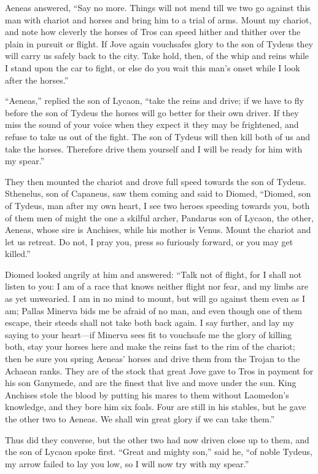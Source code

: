 Aeneas answered, “Say no more. Things will not mend till we two go against
this man with chariot and horses and bring him to a trial of arms. Mount
my chariot, and note how cleverly the horses of Tros can speed hither and
thither over the plain in pursuit or flight. If Jove again vouchsafes
glory to the son of Tydeus they will carry us safely back to the city.
Take hold, then, of the whip and reins while I stand upon the car to
fight, or else do you wait this man’s onset while I look after the
horses.”

“Aeneas,” replied the son of Lycaon, “take the reins and drive; if we have
to fly before the son of Tydeus the horses will go better for their own
driver. If they miss the sound of your voice when they expect it they may
be frightened, and refuse to take us out of the fight. The son of Tydeus
will then kill both of us and take the horses. Therefore drive them
yourself and I will be ready for him with my spear.”

They then mounted the chariot and drove full speed towards the son of
Tydeus. Sthenelus, son of Capaneus, saw them coming and said to Diomed,
“Diomed, son of Tydeus, man after my own heart, I see two heroes speeding
towards you, both of them men of might the one a skilful archer, Pandarus
son of Lycaon, the other, Aeneas, whose sire is Anchises, while his mother
is Venus. Mount the chariot and let us retreat. Do not, I pray you, press
so furiously forward, or you may get killed.”

Diomed looked angrily at him and answered: “Talk not of flight, for I
shall not listen to you: I am of a race that knows neither flight nor
fear, and my limbs are as yet unwearied. I am in no mind to mount, but
will go against them even as I am; Pallas Minerva bids me be afraid of no
man, and even though one of them escape, their steeds shall not take both
back again. I say further, and lay my saying to your heart—if
Minerva sees fit to vouchsafe me the glory of killing both, stay your
horses here and make the reins fast to the rim of the chariot; then be
sure you spring Aeneas’ horses and drive them from the Trojan to the
Achaean ranks. They are of the stock that great Jove gave to Tros in
payment for his son Ganymede, and are the finest that live and move under
the sun. King Anchises stole the blood by putting his mares to them
without Laomedon’s knowledge, and they bore him six foals. Four are still
in his stables, but he gave the other two to Aeneas. We shall win great
glory if we can take them.”

Thus did they converse, but the other two had now driven close up to them,
and the son of Lycaon spoke first. “Great and mighty son,” said he, “of
noble Tydeus, my arrow failed to lay you low, so I will now try with my
spear.”

